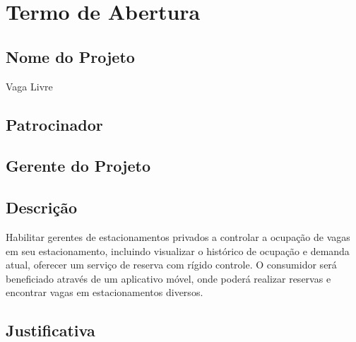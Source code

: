 \section{Termo de Abertura}

\subsection{Nome do Projeto}

Vaga Livre

\subsection{Patrocinador}

\projectSponsorName


\subsection{Gerente do Projeto}

\projectManagerName


\subsection{Descrição}

Habilitar gerentes de estacionamentos privados a controlar a ocupação de vagas em seu estacionamento, incluindo visualizar o histórico de ocupação e demanda atual, oferecer um serviço de reserva com rígido controle.
O consumidor será beneficiado através de um aplicativo móvel, onde poderá realizar reservas e encontrar vagas em estacionamentos diversos.


\subsection{Justificativa}

